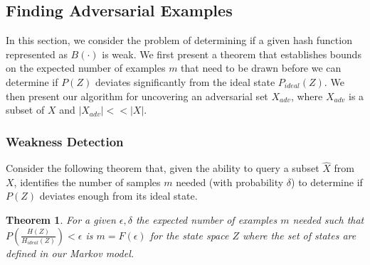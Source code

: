 \documentclass[letterpaper,twocolumn,10pt]{article}
\newtheorem{theorem}{Theorem}
\begin{document}
\subsection{Finding Adversarial Examples}
In this section, we consider the problem of determining if a given hash function represented as $B(\cdot)$ is weak. We first present a theorem that establishes bounds on the expected number of examples $m$ that need to be drawn before we can determine if $P(Z)$ deviates significantly from the ideal state $P_{ideal}(Z)$. We then present our algorithm for uncovering an adversarial set $X_{adv}$, where $X_{adv}$ is a subset of $X$ and $|X_{adv}|  << |X|$. 

\subsubsection{Weakness Detection}
Consider the following theorem that, given the ability to query a subset $\hat{X}$ from $X$, identifies the number of samples $m$ needed (with probability $\delta$) to determine if $P(Z)$ deviates enough from its ideal state. 

\begin{theorem}
\label{mainThm}
For a given $\epsilon, \delta$  the expected number of examples $m$ needed such that $P(\frac{H(Z)}{H_{ideal}(Z)}) < \epsilon$  is $m = F(\epsilon)$ for the state space $Z$ where the set of states are defined in our Markov model. 
\end{theorem}
\end{document}
